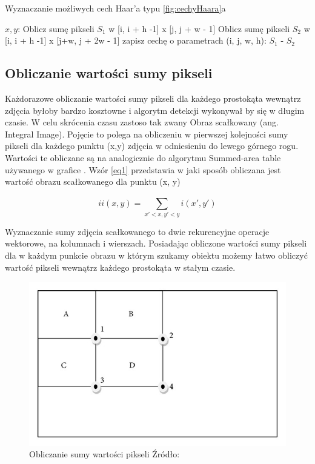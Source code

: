 \documentclass{article}
\numberwithin{equation}{section}
\begin{document}
\begin{algorithm}[H]
\caption{Wyznaczanie możliwych cech Haar'a typu \ref{fig:cechyHaara}a}
\label{alg:sumaPikseli}
\begin{algorithmic} 
\DontPrintSemicolon
\STATE $x, y$: 
\STATE Oblicz sumę pikseli ${S_{1}}$ w [i, i + h -1] x [j, j + w - 1]
\STATE Oblicz sumę pikseli $S_2$ w [i, i + h -1] x [j+w, j + 2w - 1]
\STATE zapisz cechę o parametrach (i, j, w, h): ${S_{1}}$ - ${S_{2}}$
\ENDFOR
\ENDFOR
\ENDFOR
\ENDFOR
\end{algorithmic}
\end{algorithm}

\subsection{Obliczanie wartości sumy pikseli}

Każdorazowe obliczanie wartości sumy pikseli dla każdego prostokąta wewnątrz zdjęcia byłoby bardzo kosztowne i algorytm detekcji wykonywał by się w długim czasie. W celu skrócenia czasu zastoso tak zwany Obraz scałkowany (ang. Integral Image).
Pojęcie to polega na obliczeniu w pierwszej kolejności sumy pikseli dla każdego punktu (x,y) zdjęcia w odniesieniu do lewego górnego rogu. Wartości te obliczane są na analogicznie do  algorytmu Summed-area table używanego w grafice \cite{sumAreaTable}. Wzór \ref{eq1} przedstawia w jaki sposób obliczana jest wartość obrazu scałkowanego dla punktu (x, y)

\begin{equation} \label{eq1}
ii(x,y) = \sum_{x'<x, y'<y}^{} i(x', y')
\end{equation}

Wyznaczanie sumy zdjęcia scałkowanego to dwie rekurencyjne operacje wektorowe, na kolumnach i wierszach.
Posiadając obliczone wartości sumy pikseli dla w każdym punkcie obrazu w którym szukamy obiektu możemy łatwo obliczyć wartość pikseli wewnątrz każdego prostokąta w stałym czasie.

\begin{figure}[H]
\centering
\includegraphics[scale=1.4]{sumPixels.png}
\caption{Obliczanie sumy wartości pikseli Źródło: \cite{sumPixelsDoc}}
\label{fig:obrazScalkowany}
\end{figure}
\end{document}
